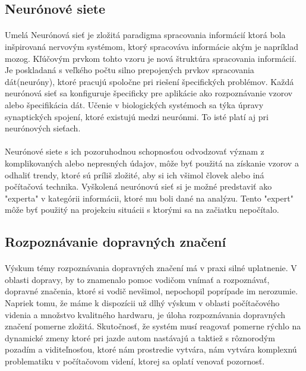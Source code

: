 \documentclass[12pt]{article}
\begin{document}
\subsection{Neurónové siete}
\paragraph{}
Umelá Neurónová sieť je zložitá paradigma spracovania informácií ktorá bola inšpirovaná nervovým systémom, ktorý spracováva informácie akým je napríklad mozog. Kľúčovým prvkom tohto vzoru je nová štruktúra spracovania informácií. Je poskladaná s veľkého počtu silno prepojených prvkov spracovania dát(neuróny), ktoré pracujú spoločne pri riešení špecifických problémov. Každá neurónová sieť sa konfiguruje špecificky pre aplikácie ako rozpoznávanie vzorov alebo špecifikácia dát. Učenie v biologických systémoch sa týka úpravy synaptických spojení, ktoré existujú medzi neurónmi. To isté platí aj pri neurónových sieťach.
\cite{neural_network}
\paragraph{}
Neurónové siete s ich pozoruhodnou schopnosťou odvodzovať význam z komplikovaných alebo nepresných údajov, môže byť použitá na získanie vzorov a odhaliť trendy, ktoré sú príliš zložité, aby si ich všimol človek alebo iná počítačová technika. Vyškolená neurónovú sieť si je možné predstaviť ako "experta" v kategórii informácii, ktoré mu boli dané na analýzu. Tento "expert" môže byť použitý na projekciu situácii s ktorými sa na začiatku nepočítalo. 
\cite{neural_network}
\subsection{Rozpoznávanie dopravných značení}
\paragraph{}
Výskum témy rozpoznávania dopravných značení má v praxi silné uplatnenie. V oblasti dopravy, by to znamenalo pomoc vodičom vnímať a rozpoznávať, dopravné značenia, ktoré si vodič nevšimol, nepochopil poprípade im nerozumie.
Napriek tomu, že máme k dispozícii už dlhý výskum v oblasti počítačového videnia a množstvo kvalitného hardwaru, je úloha rozpoznávania dopravných značení pomerne zložitá.
Skutočnosť, že systém musí reagovať pomerne rýchlo na dynamické zmeny ktoré pri jazde autom nastávajú a taktiež s rôznorodým pozadím a viditeľnosťou, ktoré nám prostredie vytvára,
nám vytvára komplexnú problematiku v počítačovom videní, ktorej sa oplatí venovať pozornosť.\cite{tfs_pdf}
\end{document}
